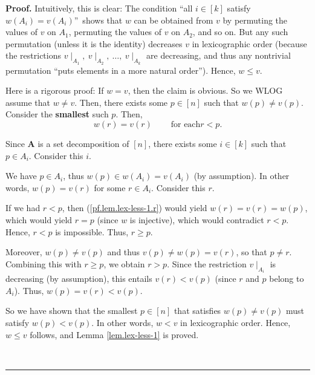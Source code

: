 \documentclass[numbers=enddot,12pt,final,onecolumn,notitlepage]{scrartcl}%
\numberwithin{exer}{subsection}
\theoremstyle{definition}
\newenvironment{fineprint}{\medskip \begin{small}}{\end{small} \medskip}
\newenvironment{proof}[1][Proof]{\noindent\textbf{#1.} }{\ \rule{0.5em}{0.5em}}
\begin{document}
\begin{proof}
Intuitively, this is clear: The condition \textquotedblleft all $i\in\left[
k\right]  $ satisfy $w\left(  A_{i}\right)  =v\left(  A_{i}\right)
$\textquotedblright\ shows that $w$ can be obtained from $v$ by permuting the
values of $v$ on $A_{1}$, permuting the values of $v$ on $A_{2}$, and so on.
But any such permutation (unless it is the identity) decreases $v$ in
lexicographic order (because the restrictions $v\mid_{A_{1}},\ v\mid_{A_{2}%
},\ \ldots,\ v\mid_{A_{k}}$ are decreasing, and thus any nontrivial
permutation \textquotedblleft puts elements in a more natural
order\textquotedblright). Hence, $w\leq v$.

\begin{fineprint}
Here is a rigorous proof: If $w=v$, then the claim is obvious. So we WLOG
assume that $w\neq v$. Then, there exists some $p\in\left[  n\right]  $ such
that $w\left(  p\right)  \neq v\left(  p\right)  $. Consider the
\textbf{smallest} such $p$. Then,%
\begin{equation}
w\left(  r\right)  =v\left(  r\right)  \ \ \ \ \ \ \ \ \ \ \text{for each
}r<p. \label{pf.lem.lex-less-1.r}%
\end{equation}


Since $\mathbf{A}$ is a set decomposition of $\left[  n\right]  $, there
exists some $i\in\left[  k\right]  $ such that $p\in A_{i}$. Consider this $i$.

We have $p\in A_{i}$, thus $w\left(  p\right)  \in w\left(  A_{i}\right)
=v\left(  A_{i}\right)  $ (by assumption). In other words, $w\left(  p\right)
=v\left(  r\right)  $ for some $r\in A_{i}$. Consider this $r$.

If we had $r<p$, then (\ref{pf.lem.lex-less-1.r}) would yield $w\left(
r\right)  =v\left(  r\right)  =w\left(  p\right)  $, which would yield $r=p$
(since $w$ is injective), which would contradict $r<p$. Hence, $r<p$ is
impossible. Thus, $r\geq p$.

Moreover, $w\left(  p\right)  \neq v\left(  p\right)  $ and thus $v\left(
p\right)  \neq w\left(  p\right)  =v\left(  r\right)  $, so that $p\neq r$.
Combining this with $r\geq p$, we obtain $r>p$. Since the restriction
$v\mid_{A_{i}}$ is decreasing (by assumption), this entails $v\left(
r\right)  <v\left(  p\right)  $ (since $r$ and $p$ belong to $A_{i}$). Thus,
$w\left(  p\right)  =v\left(  r\right)  <v\left(  p\right)  $.

So we have shown that the smallest $p\in\left[  n\right]  $ that satisfies
$w\left(  p\right)  \neq v\left(  p\right)  $ must satisfy $w\left(  p\right)
<v\left(  p\right)  $. In other words, $w<v$ in lexicographic order. Hence,
$w\leq v$ follows, and Lemma \ref{lem.lex-less-1} is proved.
\end{fineprint}
\end{proof}
\end{document}
